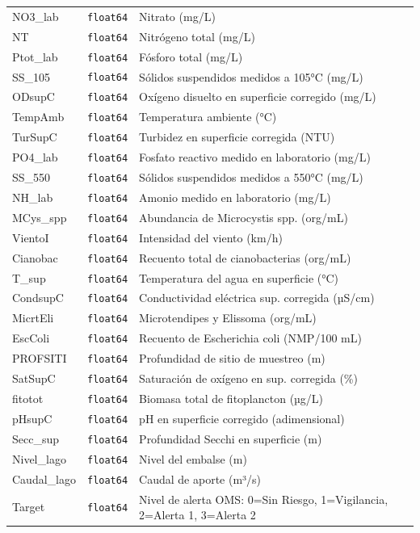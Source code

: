\documentclass[11pt]{report}
\begin{document}
\begin{longtable}{llp{8cm}}
NO3\_lab & \texttt{float64} & Nitrato (mg/L) \\
NT & \texttt{float64} & Nitrógeno total (mg/L) \\
Ptot\_lab & \texttt{float64} & Fósforo total (mg/L) \\
\hline
SS\_105 & \texttt{float64} & Sólidos suspendidos medidos a 105°C (mg/L) \\
ODsupC & \texttt{float64} & Oxígeno disuelto en superficie corregido (mg/L) \\
TempAmb & \texttt{float64} & Temperatura ambiente (°C) \\
TurSupC & \texttt{float64} & Turbidez en superficie corregida (NTU) \\
PO4\_lab & \texttt{float64} & Fosfato reactivo medido en laboratorio (mg/L) \\
SS\_550 & \texttt{float64} & Sólidos suspendidos medidos a 550°C (mg/L) \\
NH\_lab & \texttt{float64} & Amonio medido en laboratorio (mg/L) \\
MCys\_spp & \texttt{float64} & Abundancia de Microcystis spp. (org/mL) \\
VientoI & \texttt{float64} & Intensidad del viento (km/h) \\
Cianobac & \texttt{float64} & Recuento total de cianobacterias (org/mL) \\
T\_sup & \texttt{float64} & Temperatura del agua en superficie (°C) \\
CondsupC & \texttt{float64} & Conductividad eléctrica sup. corregida (µS/cm) \\
MicrtEli & \texttt{float64} & Microtendipes y Elissoma (org/mL) \\
EscColi & \texttt{float64} & Recuento de Escherichia coli (NMP/100 mL) \\
PROFSITI & \texttt{float64} & Profundidad de sitio de muestreo (m) \\
SatSupC & \texttt{float64} & Saturación de oxígeno en sup. corregida (\%) \\
fitotot & \texttt{float64} & Biomasa total de fitoplancton (µg/L) \\
pHsupC & \texttt{float64} & pH en superficie corregido (adimensional) \\
Secc\_sup & \texttt{float64} & Profundidad Secchi en superficie (m) \\
Nivel\_lago & \texttt{float64} & Nivel del embalse (m) \\
Caudal\_lago & \texttt{float64} & Caudal de aporte (m³/s) \\
Target & \texttt{float64} & Nivel de alerta OMS: 0=Sin Riesgo, 1=Vigilancia, 2=Alerta 1, 3=Alerta 2 \\
\end{longtable}
\end{document}
